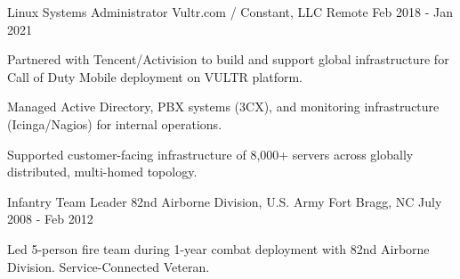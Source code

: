 \begin{cventries}

	\cventry
	{Linux Systems Administrator}
	{Vultr.com / Constant, LLC}
	{Remote}
	{Feb 2018 - Jan 2021}
	{
		\begin{cvitems}
		\item {Partnered with Tencent/Activision to build and support global infrastructure for Call of Duty Mobile deployment on VULTR platform.}
		\item {Managed Active Directory, PBX systems (3CX), and monitoring infrastructure (Icinga/Nagios) for internal operations.}
		\item {Supported customer-facing infrastructure of 8,000+ servers across globally distributed, multi-homed topology.}
		\end{cvitems}
	}
	\vspace{3mm}


	\cventry
	{Infantry Team Leader}
	{82nd Airborne Division, U.S. Army}
	{Fort Bragg, NC}
	{July 2008 - Feb 2012}
	{
		\vspace{-2mm}
		\begin{cvitems}
		\item {Led 5-person fire team during 1-year combat deployment with 82nd Airborne Division. Service-Connected Veteran.}
		\end{cvitems}
	}

\end{cventries}
